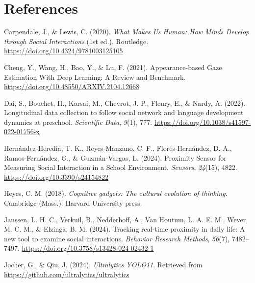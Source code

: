 \documentclass[
  man,floatsintext]{apa6}
\newlength{\cslhangindent}
\newenvironment{CSLReferences}[2] %
 {\begin{list}{}{%
  \setlength{\itemindent}{0pt}
  \setlength{\leftmargin}{0pt}
  \setlength{\parsep}{0pt}
  \ifodd #1
   \setlength{\leftmargin}{\cslhangindent}
   \setlength{\itemindent}{-1\cslhangindent}
  \fi
  \setlength{\itemsep}{#2\baselineskip}}}
 {\end{list}}
\begin{document}
\newpage

\section{References}\label{references-1}

\begingroup
\setlength{\parindent}{-0.5in}
\setlength{\leftskip}{0.5in}

\label{refs}
\begin{CSLReferences}{1}{0}
Carpendale, J., \& Lewis, C. (2020). \emph{What {Makes Us Human}: {How Minds Develop} through {Social Interactions}} (1st ed.). Routledge. \url{https://doi.org/10.4324/9781003125105}

Cheng, Y., Wang, H., Bao, Y., \& Lu, F. (2021). Appearance-based {Gaze Estimation With Deep Learning}: {A Review} and {Benchmark}. \url{https://doi.org/10.48550/ARXIV.2104.12668}

Dai, S., Bouchet, H., Karsai, M., Chevrot, J.-P., Fleury, E., \& Nardy, A. (2022). Longitudinal data collection to follow social network and language development dynamics at preschool. \emph{Scientific Data}, \emph{9}(1), 777. \url{https://doi.org/10.1038/s41597-022-01756-x}

Hernández-Heredia, T. K., Reyes-Manzano, C. F., Flores-Hernández, D. A., Ramos-Fernández, G., \& Guzmán-Vargas, L. (2024). Proximity {Sensor} for {Measuring Social Interaction} in a {School Environment}. \emph{Sensors}, \emph{24}(15), 4822. \url{https://doi.org/10.3390/s24154822}

Heyes, C. M. (2018). \emph{Cognitive gadgets: The cultural evolution of thinking}. Cambridge (Mass.): Harvard University press.

Janssen, L. H. C., Verkuil, B., Nedderhoff, A., Van Houtum, L. A. E. M., Wever, M. C. M., \& Elzinga, B. M. (2024). Tracking real-time proximity in daily life: {A} new tool to examine social interactions. \emph{Behavior Research Methods}, \emph{56}(7), 7482--7497. \url{https://doi.org/10.3758/s13428-024-02432-1}

Jocher, G., \& Qiu, J. (2024). \emph{Ultralytics {YOLO11}}. Retrieved from \url{https://github.com/ultralytics/ultralytics}


\end{CSLReferences}
\end{document}
